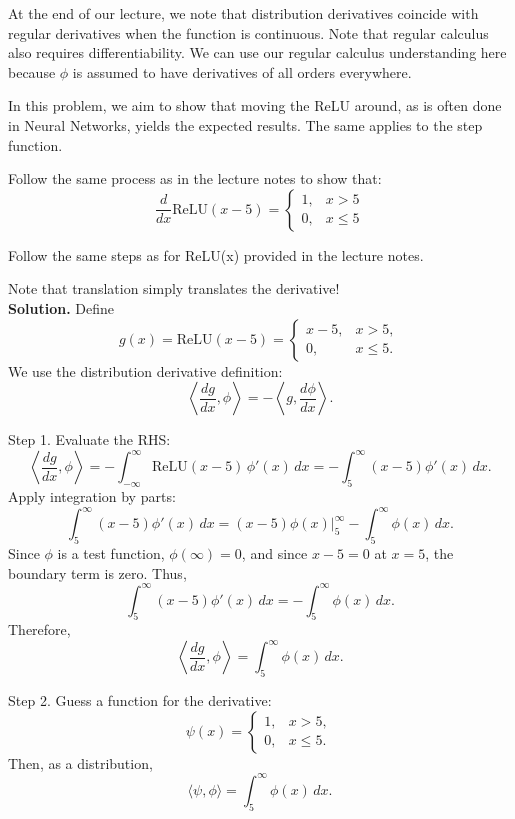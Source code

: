 \documentclass[11pt]{article}
\begin{document}
	At the end of our lecture, we note that distribution derivatives coincide with regular derivatives when the function is continuous. Note that regular calculus also requires differentiability. We can use our regular calculus understanding here because $\phi$ is assumed to have derivatives of all orders everywhere.
	
	In this problem, we aim to show that moving the ReLU around, as is often done in Neural Networks, yields the expected results. The same applies to the step function.
	
	Follow the same process as in the lecture notes to show that:
	\[
	\frac{d}{dx}\text{ReLU}(x - 5) =
	\begin{cases}
		1, & x > 5 \\
		0, & x \le 5
	\end{cases}
	\]
	
	Follow the same steps as for ReLU(x) provided in the lecture notes.
	
	Note that translation simply translates the derivative!\\
	
	\textbf{Solution.}
	Define
	\[
	g(x)=\mathrm{ReLU}(x-5)=
	\begin{cases}
		x-5, & x>5,\\
		0, & x\le 5.
	\end{cases}
	\]
	We use the distribution derivative definition:
	\[
	\left\langle \frac{d g}{dx}, \phi \right\rangle
	=
	-
	\left\langle g,\frac{d\phi}{dx}\right\rangle.
	\]
	
	Step 1. Evaluate the RHS:
	\[
	\left\langle \frac{d g}{dx}, \phi \right\rangle
	=
	-\int_{-\infty}^{\infty} \mathrm{ReLU}(x-5)\,\phi'(x)\,dx
	=
	-\int_{5}^{\infty} (x-5)\phi'(x)\,dx.
	\]
	Apply integration by parts:
	\[
	\int_{5}^{\infty} (x-5)\phi'(x)\,dx
	=
	(x-5)\phi(x)\Big|_{5}^{\infty}
	-
	\int_{5}^{\infty}\phi(x)\,dx.
	\]
	Since \(\phi\) is a test function, \(\phi(\infty)=0\), and since \(x-5=0\) at \(x=5\), the boundary term is zero. Thus,
	\[
	\int_{5}^{\infty} (x-5)\phi'(x)\,dx
	=
	-\int_{5}^{\infty}\phi(x)\,dx.
	\]
	Therefore,
	\[
	\left\langle \frac{d g}{dx}, \phi \right\rangle
	=
	\int_{5}^{\infty}\phi(x)\,dx.
	\]
	
	Step 2. Guess a function for the derivative:
	\[
	\psi(x)=
	\begin{cases}
		1, & x>5,\\
		0, & x\le 5.
	\end{cases}
	\]
	Then, as a distribution,
	\[
	\langle \psi,\phi\rangle
	=
	\int_{5}^{\infty}\phi(x)\,dx.
	\]
	
\end{document}
